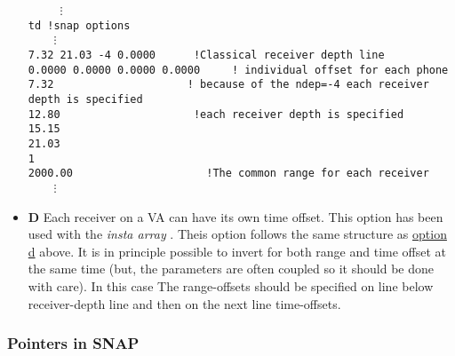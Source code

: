\documentclass{saclantc}
\begin{document}
\begin{itemize}
{\tt
~~~~$\vdots$\\
td 	!snap options \\
~~~~$\vdots$ \\
  7.32  21.03 -4   0.0000~~~~~  !Classical receiver depth line \\
  0.0000   0.0000   0.0000   0.0000~~~~ ! individual offset for each phone\\
  7.32   ~~~~~~~~~~~~~~~~~~~ ! because of the ndep=-4 each receiver depth
  is specified\\
 12.80  ~~~~~~~~~~~~~~~~~~~ !each receiver depth is specified\\
 15.15 \\
 21.03 \\
1\\
2000.00 ~~~~~~~~~~~~~~~~~~~ !The common range for each receiver\\
~~~~$\vdots$
}
\item{\bf D} Each receiver on a VA can have its own time offset. This
  option has been used with the {\it insta array}
  \cite{thode05}. Theis option follows the same structure as
  \underline{option d} above. It is in principle possible to invert
  for both range and time offset at the same time (but, the parameters
  are often coupled so it should be done with care). In this case The
  range-offsets should be specified on line below receiver-depth line and then on the next line
  time-offsets.
\end{itemize}


\subsubsection{Pointers in SNAP}
\label{se:snappoint}
\end{document}
